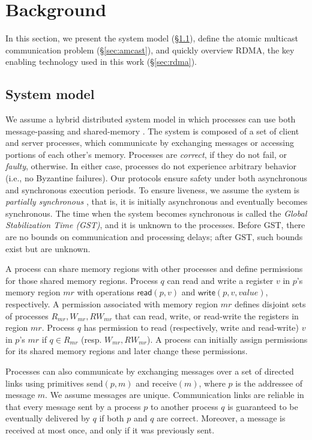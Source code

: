 \section{Background}
\label{sec:background}

In this section, we present the system model (\S\ref{sec:system-model}), define the atomic multicast communication problem (\S\ref{sec:amcast}), and quickly overview RDMA, the key enabling technology used in this work (\S\ref{sec:rdma}).

\subsection{System model}
\label{sec:system-model}

We assume a hybrid distributed system model in which processes can use both message-passing and shared-memory \cite{Aguilera2019}.
The system is composed of a set of client and server processes, which communicate by exchanging messages or accessing portions of each other's memory.
Processes are \emph{correct}, if they do not fail, or \emph{faulty}, otherwise. 
In either case, processes do not experience arbitrary behavior (i.e., no Byzantine failures).
Our protocols ensure safety under both asynchronous and synchronous execution periods. 
To ensure liveness, we assume the system is \emph{partially synchronous} \cite{DLS88}, 
that is, it is initially asynchronous and eventually becomes synchronous. The time when the 
system becomes synchronous is called the \emph{Global Stabilization Time (GST)}, and it is unknown to the processes.
Before GST, there are no bounds on communication and processing delays; after GST, such bounds exist but are unknown. 

A process can share memory regions with other processes and define permissions for those shared memory regions. 
Process $q$ can read and write a register $v$ in $p$'s memory region $mr$ with operations $\textsf{read}(p,v)$ and $\textsf{write}(p,v,value)$, respectively.
A permission associated with memory region $mr$ defines disjoint sets of processes $R_{mr}, W_{mr}, RW_{mr}$ that can read, write, or read-write the registers in region $mr$. 
Process $q$ has permission to read (respectively, write and read-write) $v$ in $p$'s $mr$ if $q \in R_{mr}$ (resp. $W_{mr}, RW_{mr}$).
A process can initially assign permissions for its shared memory regions and later change these permissions.

Processes can also communicate by exchanging messages over a set of directed links using primitives \textsf{send}$(p, m)$ and \textsf{receive}$(m)$, where $p$ is the addressee of message $m$.
We assume messages are unique.
Communication links are reliable in that every message sent by a process $p$ to another process $q$ is guaranteed to be eventually delivered by $q$ if both $p$ and $q$ are correct.
Moreover, a message is received at most once, and only if it was previously sent.


